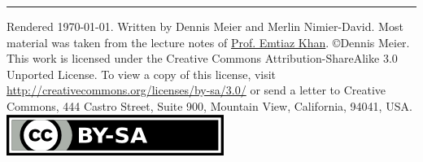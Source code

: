 \documentclass[10pt,a4paper,landscape]{article}
\begin{document}
\begin{multicols*}{4}



\hrule
\tiny
Rendered \today. Written by Dennis Meier and Merlin Nimier-David. Most material was taken from the lecture notes of \href{http://people.epfl.ch/228491}{Prof. Emtiaz Khan}.
\copyright Dennis Meier. This work is licensed under the Creative Commons Attribution-ShareAlike 3.0 Unported License.
To view a copy of this license, visit \href{http://creativecommons.org/licenses/by-sa/3.0/}{http://creativecommons.org/licenses/by-sa/3.0/} or
send a letter to Creative Commons, 444 Castro Street, Suite 900, Mountain View, California, 94041, USA.
\includegraphics{images/by-sa.png}

\end{multicols*}
\end{document}
